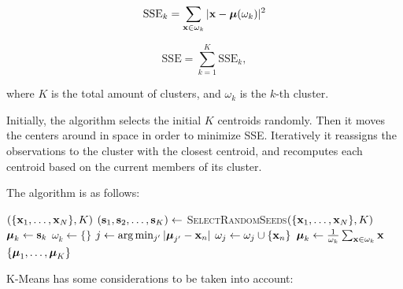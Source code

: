 $$ \text{SSE}_k = \sum_{\boldsymbol{\mathbf{x}} \in \omega_k} |\boldsymbol{\mathbf{x}} - \boldsymbol{\mathbf{\mu}}(\omega_k)|^2 $$

$$ \text{SSE} = \sum_{k = 1}^K \text{SSE}_k, $$

where $K$ is the total amount of clusters, and $\omega_k$ is the $k$-th cluster.

Initially, the algorithm selects the initial $K$ centroids randomly.
%
Then it moves the centers around in space in order to minimize SSE.
%
Iteratively it reassigns the observations to the cluster with the closest
centroid, and recomputes each centroid based on the current members of its
cluster. 

The algorithm is as follows: \vspace{.3cm}

\begin{algorithmic}
$(\{\boldsymbol{\mathbf{x}}_1, \ldots, \boldsymbol{\mathbf{x}}_N\}, K)$
    \STATE $(\boldsymbol{\mathbf{s}}_1, \boldsymbol{\mathbf{s}}_2, \ldots, \boldsymbol{\mathbf{s}}_K) \gets$ {\scshape SelectRandomSeeds}$(\{\boldsymbol{\mathbf{x}}_1, \ldots, \boldsymbol{\mathbf{x}}_N\}, K)$
     \STATE $\boldsymbol{\mathbf{\mu}}_k \gets \boldsymbol{\mathbf{s}}_k$ \ENDFOR
            \STATE $\omega_k \gets \{\}$
        \ENDFOR
            \STATE $j \gets \text{arg} \min_{j'} |\boldsymbol{\mathbf{\mu}}_{j'} - \boldsymbol{\mathbf{x}}_n|$
            \STATE $\omega_j \gets \omega_j \cup \{\boldsymbol{\mathbf{x}}_n\}$
        \ENDFOR
            \STATE $\boldsymbol{\mathbf{\mu}}_k \gets \frac{1}{\omega_k}\sum_{\boldsymbol{\mathbf{x}}\in\omega_k}\boldsymbol{\mathbf{x}}$
        \ENDFOR
    \ENDWHILE
    \RETURN $\{\boldsymbol{\mathbf{\mu}}_1, \ldots, \boldsymbol{\mathbf{\mu}}_K\}$
\end{algorithmic}

K-Means has some considerations to be taken into account:

